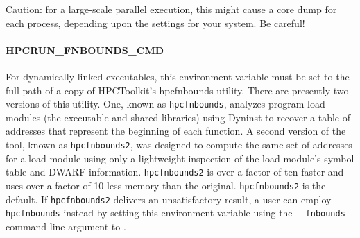 \parg
Caution: for a large-scale parallel execution, this might cause a
core dump for each process, depending upon the settings for your
system. Be careful!

\paragraph{HPCRUN\_FNBOUNDS\_CMD}

For dynamically-linked executables, this environment variable must
be set to the full path of a copy of HPCToolkit's hpcfnbounds
utility. There are presently two versions of this utility. One, known as \verb|hpcfnbounds|, analyzes program load modules (the executable and shared libraries) using Dyninst to recover a table of addresses that represent the beginning of each function. A second version of the tool, known as \verb|hpcfnbounds2|, was designed to compute  the same set of addresses for a load module using only a lightweight inspection of the load module's symbol table and DWARF information. \verb|hpcfnbounds2| is over a factor of ten faster and uses over a factor of 10 less memory than the original. \verb|hpcfnbounds2|  is the default. If \verb|hpcfnbounds2| delivers an unsatisfactory result, a user can employ \verb|hpcfnbounds| instead by setting this environment variable using the \verb|--fnbounds| command line argument to \hpcrun{}.


